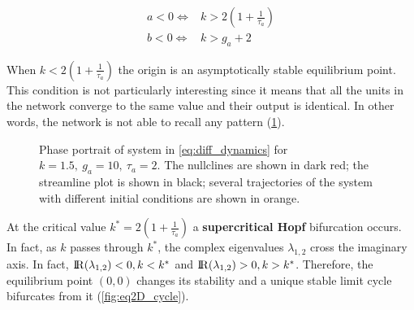 \begin{equation}
\begin{aligned}
 a < 0 \iff & k > 2(1 + \frac{1}{\tau_a}) \\
 b < 0 \iff & k > g_a + 2
\end{aligned}
\end{equation}

When $k<2(1+\frac{1}{\tau_a})$ the origin is an asymptotically stable equilibrium point. This condition is not particularly interesting since it means that all the units in the network converge to the same value and their output is identical. In other words, the network is not able to recall any pattern (\cref{fig:eq2D_focus}).

\begin{figure}[H]
        \caption{\label{fig:eq2D_focus} Phase portrait of system in \eqref{eq:diff_dynamics} for $k=1.5,\ g_a=10,\ \tau_a=2$. The nullclines are shown in dark red; the streamline plot is shown in black; several trajectories of the system with different initial conditions are shown in orange.}
\end{figure}


At the critical value $k^* = 2 ( 1 + \frac{1}{\tau_a} ) $ a \textbf{supercritical Hopf} bifurcation occurs. In fact, as $k$ passes through $k^*$, the complex eigenvalues $\lambda_{1,2}$ cross the imaginary axis. In fact, ${\rm I\!R}(\lambda_{1,2})<0, k < k^*$ and  ${\rm I\!R}(\lambda_{1,2})>0, k > k^*$. Therefore, the equilibrium point $(0, 0)$ changes its stability and a unique stable limit cycle bifurcates from it (\cref{fig:eq2D_cycle}).

